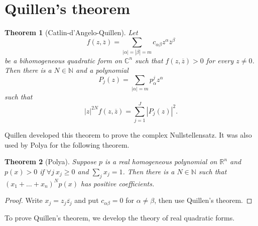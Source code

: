\documentclass[12pt]{report}
\newcommand{\NN}{\mathbb{N}}
\newcommand{\RR}{\mathbb{R}}
\newcommand{\CC}{\mathbb{C}}
\newtheorem{theorem}{Theorem}[chapter]
\theoremstyle{definition}
\begin{document}
\section{Quillen's theorem}
\begin{theorem}[Catlin-d'Angelo-Quillen]
    Let
    $$f(z, \overline z) = \sum_{|\alpha| = |\beta| = m} c_{\alpha\beta} z^\alpha \overline z^\beta$$
    be a bihomogeneous quadratic form on $\CC^n$ such that $f(z, \overline z) > 0$ for every $z \neq 0$. Then there is a $N \in \NN$ and a polynomial
    $$P_j(z) = \sum_{|\alpha| = m} p_\alpha^j z^\alpha$$
    such that 
    $$|z|^{2N} f(z, \overline z) = \sum_{j=1}^J |P_j(z)|^2.$$
\end{theorem}
    Quillen developed this theorem to prove the complex Nullstellensatz. It was also used by Polya for the following theorem.
\begin{theorem}[Polya]
    Suppose $p$ is a real homogeneous polynomial on $\RR^n$ and $p(x) > 0$ if $\forall j ~x_j \geq 0$ and $\sum_j x_j = 1$. Then there is a $N \in \NN$ such that $(x_1 + \dots + x_n)^Np(x)$ has positive coefficients.
\end{theorem}
\begin{proof}
    Write $x_j = z_j \overline{z_j}$ and put $c_{\alpha\beta} = 0$ for $\alpha \neq \beta$, then use Quillen's theorem.
\end{proof}
    To prove Quillen's theorem, we develop the theory of real quadratic forms.
\end{document}
